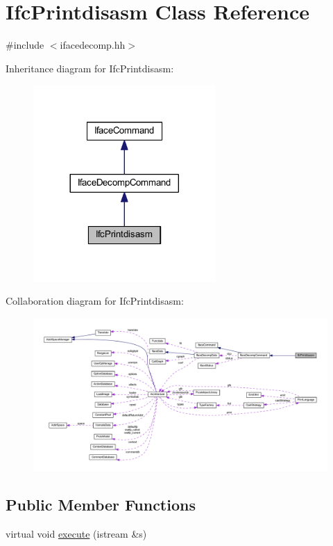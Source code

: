 \hypertarget{class_ifc_printdisasm}{}\section{Ifc\+Printdisasm Class Reference}
\label{class_ifc_printdisasm}


{\ttfamily \#include $<$ifacedecomp.\+hh$>$}



Inheritance diagram for Ifc\+Printdisasm\+:
\nopagebreak
\begin{figure}[H]
\begin{center}
\leavevmode
\includegraphics[width=197pt]{class_ifc_printdisasm__inherit__graph}
\end{center}
\end{figure}


Collaboration diagram for Ifc\+Printdisasm\+:
\nopagebreak
\begin{figure}[H]
\begin{center}
\leavevmode
\includegraphics[width=350pt]{class_ifc_printdisasm__coll__graph}
\end{center}
\end{figure}
\subsection*{Public Member Functions}
\begin{DoxyCompactItemize}
\item 
virtual void \mbox{\hyperlink{class_ifc_printdisasm_aa443ed14bb273335f4c57f80891d9cc3}{execute}} (istream \&s)
\end{DoxyCompactItemize}
